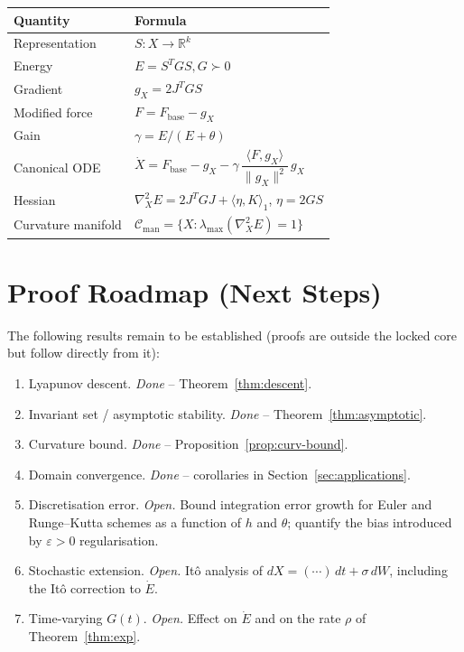 \documentclass[11pt,oneside]{amsart}
\def\quad{ }%
\def\textbf#1{#1}%
\theoremstyle{plain}
\theoremstyle{definition}
\renewcommand{\arraystretch}{1.25}
\newcommand{\Xdot}{\dot{X}}
\newcommand{\gX}{g_X}
\newcommand{\Fbase}{F_{\mathrm{base}}}
\newcommand{\Cman}{\mathcal{C}_{\mathrm{man}}}
\newcommand{\R}{\mathbb{R}}
\begin{document}
\begin{center}
\renewcommand{\arraystretch}{1.8}
\begin{tabular}{ll}
\toprule
\textbf{Quantity} & \textbf{Formula} \\
\midrule
Representation     & $S : X \to \R^{k}$ \\
Energy             & $E = S^{T}GS,\quad G\succ 0$ \\
Gradient           & $\gX = 2J^{T}GS$ \\
Modified force     & $F = \Fbase - \gX$ \\
Gain               & $\gamma = E/(E+\theta)$ \\
Canonical ODE      & $\Xdot = \Fbase - \gX
                      - \gamma\,\dfrac{\langle F,\gX\rangle}{\|\gX\|^{2}}\,\gX$ \\
Hessian            & $\nabla^{2}_{X}E = 2 J^{T}GJ + \langle\eta,K\rangle_{1}$,
                     $\eta = 2GS$ \\
Curvature manifold & $\Cman = \{X : \lambda_{\max}(\nabla^{2}_{X}E)=1\}$ \\
\bottomrule
\end{tabular}
\end{center}

\section{Proof Roadmap (Next Steps)}

The following results remain to be established (proofs are outside the locked
core but follow directly from it):

\begin{enumerate}[leftmargin=2em, label=\textbf{P\arabic*.}]
  \item \textbf{Lyapunov descent.} \emph{Done} -- Theorem~\ref{thm:descent}.
  \item \textbf{Invariant set / asymptotic stability.} \emph{Done} --
        Theorem~\ref{thm:asymptotic}.
  \item \textbf{Curvature bound.} \emph{Done} --
        Proposition~\ref{prop:curv-bound}.
  \item \textbf{Domain convergence.} \emph{Done} -- corollaries in
        Section~\ref{sec:applications}.
  \item \textbf{Discretisation error.} \emph{Open.} Bound integration
        error growth for Euler and Runge--Kutta schemes as a function
        of $h$ and $\theta$; quantify the bias introduced by
        $\varepsilon>0$ regularisation.
  \item \textbf{Stochastic extension.} \emph{Open.} Itô analysis of
        $dX = (\cdots)\,dt + \sigma\,dW$, including the It\^o correction
        to $\dot{E}$.
  \item \textbf{Time-varying $G(t)$.} \emph{Open.} Effect on
        $\dot{E}$ and on the rate $\rho$ of Theorem~\ref{thm:exp}.
\end{enumerate}
\end{document}

